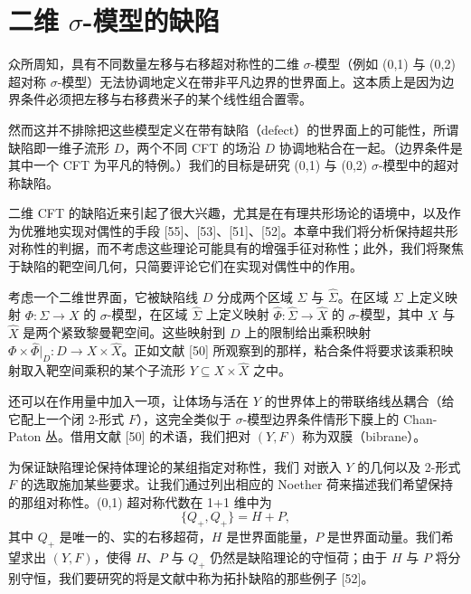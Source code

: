 \chapter{二维 \texorpdfstring{$\sigma$}{σ}-模型的缺陷}

众所周知，具有不同数量左移与右移超对称性的二维 $\sigma$-模型（例如 (0,1) 与 (0,2) 超对称 $\sigma$-模型）无法协调地定义在带非平凡边界的世界面上。这本质上是因为边界条件必须把左移与右移费米子的某个线性组合置零。

然而这并不排除把这些模型定义在带有缺陷（defect）的世界面上的可能性，所谓缺陷即一维子流形 $D$，两个不同 CFT 的场沿 $D$ 协调地粘合在一起。（边界条件是其中一个 CFT 为平凡的特例。）我们的目标是研究 (0,1) 与 (0,2) $\sigma$-模型中的超对称缺陷。

二维 CFT 的缺陷近来引起了很大兴趣，尤其是在有理共形场论的语境中，以及作为优雅地实现对偶性的手段 [55]、[53]、[51]、[52]。本章中我们将分析保持超共形对称性的判据，而不考虑这些理论可能具有的增强手征对称性；此外，我们将聚焦于缺陷的靶空间几何，只简要评论它们在实现对偶性中的作用。

考虑一个二维世界面，它被缺陷线 $D$ 分成两个区域 $\Sigma$ 与 $\hat\Sigma$。在区域 $\Sigma$ 上定义映射 $\Phi:\Sigma\to X$ 的 $\sigma$-模型，在区域 $\hat\Sigma$ 上定义映射 $\hat\Phi:\hat\Sigma\to\hat X$ 的 $\sigma$-模型，其中 $X$ 与 $\hat X$ 是两个紧致黎曼靶空间。这些映射到 $D$ 上的限制给出乘积映射 $\Phi\times\hat\Phi|_D:D\to X\times\hat X$。正如文献 [50] 所观察到的那样，粘合条件将要求该乘积映射取入靶空间乘积的某个子流形 $Y\subseteq X\times\hat X$ 之中。

还可以在作用量中加入一项，让体场与活在 $Y$ 的世界体上的带联络线丛耦合（给它配上一个闭 2-形式 $F$），这完全类似于 $\sigma$-模型边界条件情形下膜上的 Chan-Paton 丛。借用文献 [50] 的术语，我们把对 $(Y,F)$ 称为双膜（bibrane）。

为保证缺陷理论保持体理论的某组指定对称性，我们
对嵌入 $Y$ 的几何以及 2-形式 $F$ 的选取施加某些要求。让我们通过列出相应的 Noether 荷来描述我们希望保持的那组对称性。(0,1) 超对称代数在 1+1 维中为
\[
\{Q_+,Q_+\}=H+P,
\]
其中 $Q_+$ 是唯一的、实的右移超荷，$H$ 是世界面能量，$P$ 是世界面动量。我们希望求出 $(Y,F)$，使得 $H$、$P$ 与 $Q_+$ 仍然是缺陷理论的守恒荷；由于 $H$ 与 $P$ 将分别守恒，我们要研究的将是文献中称为拓扑缺陷的那些例子 [52]。

